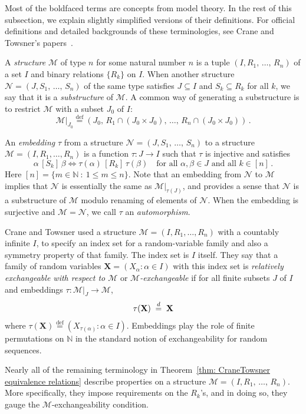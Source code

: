\documentclass[10pt]{amsart}
\theoremstyle{definition}\newtheorem{defi}[theo]{Definition}\newtheorem{rema}[theo]{Remark}\newtheorem{exam}[theo]{Example}\newtheorem{exem}[theo]{Example}\newtheorem{nota}[theo]{Notation}
\newcommand*{\defeq}{\stackrel{\mathrm{def}}{=}}
\renewcommand{\d}{\buildrel{d}\over{=}}
\newcommand*\N{\mathbb{N}}
\newcommand*\NN{\mathcal{N}}
\newcommand*\MM{\mathcal{M}}
\newcommand*\bX{\mathbf{X}}
\begin{document}
Most of the boldfaced terms are concepts from model theory. In the rest of this subsection, we explain slightly simplified versions of their definitions. For official definitions and detailed backgrounds of these terminologies, see Crane and Towsner's papers~\cite{crane2017relative,crane2018relatively}.

A \emph{structure} $\MM$ of type $n$ for some natural number $n$ is a tuple $(I,R_1,\,\ldots,\,R_n)$ of a set $I$ and binary relations $\{R_k\}$ on $I$. When another structure $\NN = (J,S_1,\,\ldots,\,S_n)$ of the same type satisfies $J \subseteq I$ and $S_k \subseteq R_k$ for all $k$, we say that it is a \emph{substructure} of $\MM$. A common way of generating a substructure is to restrict $\MM$ with a subset $J_0$ of $I$:
\[
\MM|_{J_0}
\defeq ({J_0},\,R_1\cap ({J_0}\times {J_0}),\,\ldots,\,R_n \cap ({J_0} \times {J_0}))\,.
\]

An \emph{embedding} $\tau$ from a structure $\NN = (J,S_1,\,\ldots,\,S_n)$ to a structure $\MM = (I,R_1,\ldots, R_n)$ is a function $\tau : J \to I$ such that $\tau$ is injective and satisfies
\[
\alpha\, [S_k]\, \beta \iff \tau(\alpha)\,[R_k]\,\tau(\beta)\quad
\text{for all }\alpha,\beta \in J\text{ and all }k \in [n]\,.
\]
Here $[n] = \{m \in \N~:~1 \leq m \leq n\}$. Note that an embedding from $\NN$ to $\MM$ implies that $\NN$ is essentially the same as $\MM|_{\tau(J)}$, and provides a sense that $\NN$ is a substructure of $\MM$ modulo renaming of elements of $\NN$. When the embedding is surjective and $\MM = \NN$, we call $\tau$ an \emph{automorphism}.

Crane and Towsner used a structure $\MM = (I,R_1,\ldots,R_n)$ with a countably infinite $I$, to specify an index set for a random-variable family and also a symmetry property of that family. The index set is $I$ itself. They say that a family of random variables $\bX = (X_\alpha : \alpha\in I)$ with this index set is \emph{relatively exchangeable with respect to $\MM$} or \emph{$\MM$-exchangeable} if for all finite subsets $J$ of $I$ and embeddings $\tau : \MM|_J \to \MM$,
\[
\tau(\bX)\;\d\; \bX
\]
where $\tau(\bX)
\defeq \left(X_{\tau(\alpha)} : \alpha \in I\right)$. Embeddings play the role of finite permutations on $\N$ in the standard notion of exchangeability for random sequences.

Nearly all of the remaining terminology in Theorem~\ref{thm: CraneTowsner equivalence relations} describe properties on a structure $\MM = (I,R_1,\,\ldots,\,R_n)$. More specifically, they impose requirements on the $R_k$'s, and in doing so, they gauge the $\MM$-exchangeability condition.
\end{document}
